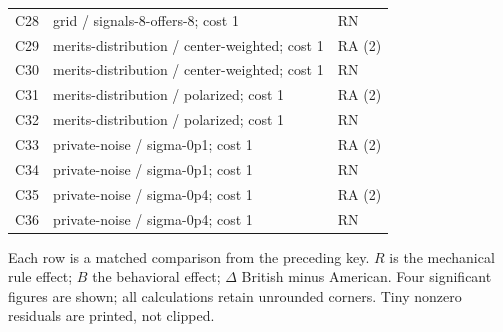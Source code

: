 \documentclass[10pt]{article}
\begin{document}
\begin{longtable}{@{}lp{5.4in}l@{}}
C28 & grid / signals-8-offers-8; cost 1 & RN\\
C29 & merits-distribution / center-weighted; cost 1 & RA (2)\\
C30 & merits-distribution / center-weighted; cost 1 & RN\\
C31 & merits-distribution / polarized; cost 1 & RA (2)\\
C32 & merits-distribution / polarized; cost 1 & RN\\
C33 & private-noise / sigma-0p1; cost 1 & RA (2)\\
C34 & private-noise / sigma-0p1; cost 1 & RN\\
C35 & private-noise / sigma-0p4; cost 1 & RA (2)\\
C36 & private-noise / sigma-0p4; cost 1 & RN\\
\end{longtable}\normalsize
{}\par\medskip
Each row is a matched comparison from the preceding key. $R$ is the mechanical rule effect; $B$ the behavioral effect; $\Delta$ British minus American. Four significant figures are shown; all calculations retain unrounded corners. Tiny nonzero residuals are printed, not clipped.\par\medskip
\end{document}
